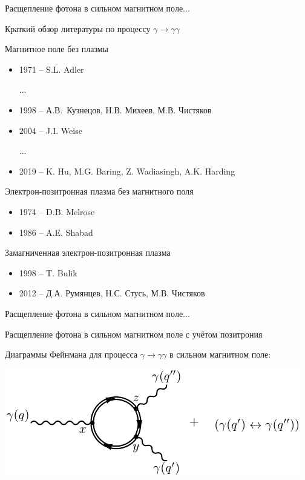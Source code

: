 \documentclass{beamer}
\begin{document}
\begin{frame}{Расщепление фотона в сильном магнитном поле...}
\begin{center}
Краткий обзор литературы по процессу $\gamma\to \gamma\gamma$

Магнитное поле без плазмы

\begin{itemize}
\item 1971 -- S.L. Adler

...

\item 1998 -- А.В.~Кузнецов, Н.В. Михеев, М.В. Чистяков
\item 2004 -- J.I. Weise

...

\item 2019 -- K. Hu, M.G. Baring, Z. Wadiasingh, A.K. Harding 
\end{itemize}

Электрон-позитронная плазма без магнитного поля

\begin{itemize}
\item 1974 -- D.B. Melrose
\item 1986 -- A.E. Shabad
\end{itemize}

Замагниченная электрон-позитронная плазма

\begin{itemize}
\item 1998 -- T. Bulik
\item 2012 -- Д.А. Румянцев, Н.С. Стусь, М.В. Чистяков
\end{itemize}

\end{center}
\end{frame}
\begin{frame}{Расщепление фотона в сильном магнитном поле...}
\begin{center}
\alert{Расщепление фотона в сильном магнитном поле с учётом позитрония}

\vspace{3mm}

Диаграммы Фейнмана для процесса $\gamma\to\gamma\gamma$ в сильном магнитном поле:

\vspace{3mm}

\includegraphics[scale=1]{fig3_1-eps-converted-to.pdf}

\end{center}
\end{frame}
\end{document}
